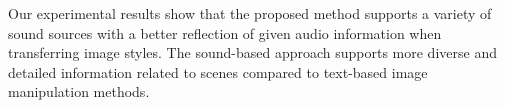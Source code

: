\documentclass[10pt,twocolumn,letterpaper]{article}
\begin{document}

Our experimental results show that the proposed method supports a variety of sound sources with a better reflection of given audio information when transferring image styles. The sound-based approach supports more diverse and detailed information related to scenes compared to text-based image manipulation methods. 




\end{document}
